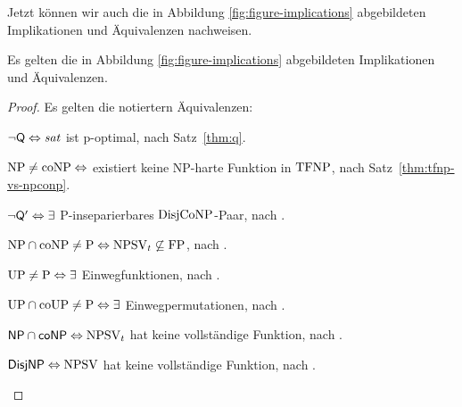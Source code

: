 Jetzt können wir auch die in Abbildung \ref{fig:figure-implications} abgebildeten Implikationen und Äquivalenzen nachweisen.
\begin{theorem}\label{thm:figure-implications}
    Es gelten die in Abbildung \ref{fig:figure-implications} abgebildeten Implikationen und Äquivalenzen.
\end{theorem}
\begin{proof}
    Es gelten die notiertern Äquivalenzen:
    \begin{Prooflist}[nosep]
    \item $\neg\mathsf{Q} \Leftrightarrow \mathit{sat}$ ist p-optimal, nach Satz~\ref{thm:q}.
    \item $\mathrm{NP}\neq\mathrm{coNP} \Leftrightarrow$ existiert keine NP-harte Funktion in $\mathrm{TFNP}$, nach Satz~\ref{thm:tfnp-vs-npconp}.
    \item $\neg\mathsf{Q}' \Leftrightarrow\exists$ P-inseparierbares $\mathrm{DisjCoNP}$-Paar, nach \textcite{fortnow_separability_2002}.
    \item $\mathrm{NP}\cap\mathrm{coNP}\neq\mathrm{P} \Leftrightarrow \mathrm{NPSV}_t\not\subseteq\mathrm{FP}$, nach \textcite{selman_taxonomy_1994}.
    \item $\mathrm{UP}\neq\mathrm{P} \Leftrightarrow\exists$ Einwegfunktionen, nach \textcite[Thm.~10]{grollmann_complexity_1988}.
    \item $\mathrm{UP}\cap\mathrm{coUP}\neq\mathrm{P} \Leftrightarrow\exists$ Einwegpermutationen, nach \textcite{homan_one-way_2003}.
    \item $\mathsf{NP}{}\cap{}\mathsf{coNP} \Leftrightarrow \mathrm{NPSV}_t$ hat keine vollständige Funktion, nach \textcite[Prop.~3]{beyersdorff_nondeterministic_2009}.
    \item $\mathsf{DisjNP} \Leftrightarrow \mathrm{NPSV}$ hat keine vollständige Funktion, nach \textcite[Thm.~9]{glaser_reductions_2005}.
    \end{Prooflist}


\end{proof}
